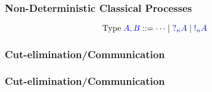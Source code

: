 \documentclass[xcolor={dvipsnames}]{beamer}
\begin{document}
\begin{frame}[label=nodcap]
  \frametitle{Non-Deterministic Classical Processes}
  \[
    \text{Type} \; \tm{A}, \tm{B} ::= \dots \mid \tm{\give[n]{A}} \mid \tm{\take[n]{A}}
  \]

  \begin{center}
    \begin{proofbox}[1]
      \SYM{\give[1]{}}
    \end{proofbox}
    \begin{proofbox}[1]
      \SYM{\take[1]{}}
    \end{proofbox}
  \end{center}

  \begin{proofblock}[1]
  \end{proofblock}
  \begin{proofblock}[1]
  \end{proofblock}
\end{frame}

\begin{frame}
  \frametitle{Cut-elimination/Communication}
  \begin{proofblock}[1]
  \end{proofblock}
\end{frame}

\begin{frame}
  \frametitle{Cut-elimination/Communication}
  \begin{proofblock}[1]
  \end{proofblock}
  \begin{proofblock}[1]
  \end{proofblock}
\end{frame}
\end{document}

